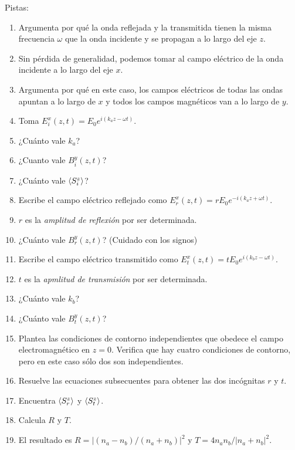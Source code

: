 \documentclass{exam}
\newenvironment{pistas}{\par\noindent Pistas:\begin{enumerate}} {\end{enumerate}}
\begin{document}
\begin{questions}
\begin{pistas}
    respectivamente.
  \item Argumenta por qué la onda reflejada y la transmitida tienen la
    misma frecuencia $\omega$ que la onda incidente y se propagan a lo
    largo del eje $z$.
  \item Sin pérdida de generalidad, podemos tomar al campo eléctrico
    de la onda incidente a lo largo del eje $x$.
  \item Argumenta por qué en este caso, los campos eléctricos de todas
    las ondas apuntan a lo largo de $x$ y todos los campos magnéticos
    van a lo largo de $y$.
  \item Toma $E_i^x(z,t)=E_0 e^{i(k_az-\omega t)}$.
  \item ¿Cuánto vale $k_a$?
  \item ¿Cuanto vale $B_i^y(z,t)$?
  \item ¿Cuánto vale $\braket{S_i^z}$?
  \item Escribe el campo eléctrico reflejado como $E_r^x(z,t)=r E_0
    e^{-i(k_az+\omega t)}$.
  \item $r$ es la {\em amplitud de reflexión} por ser determinada.
  \item ¿Cuánto vale $B_r^y(z,t)$? (Cuidado con los signos)
  \item Escribe el campo eléctrico transmitido como $E_t^x(z,t)=t E_0
    e^{i(k_bz-\omega t)}$.
  \item $t$ es la {\em apmlitud de transmisión} por ser determinada.
  \item ¿Cuánto vale $k_b$?
  \item ¿Cuánto vale $B_t^y(z,t)$?
  \item Plantea las condiciones de contorno independientes que obedece
    el campo electromagnético en $z=0$. Verifica que hay cuatro
    condiciones de contorno, pero en este caso sólo dos son independientes.
  \item Resuelve las ecuaciones subsecuentes para obtener las dos incógnitas $r$ y $t$.
  \item Encuentra $\braket{S_r^z}$ y  $\braket{S_t^z}$.
  \item Calcula $R$ y $T$.
  \item El resultado es $R=|(n_a-n_b)/(n_a+n_b)|^2$ y $T=4n_an_b/|n_a+n_b|^2$.
  \end{pistas}


\end{questions}
\end{document}
